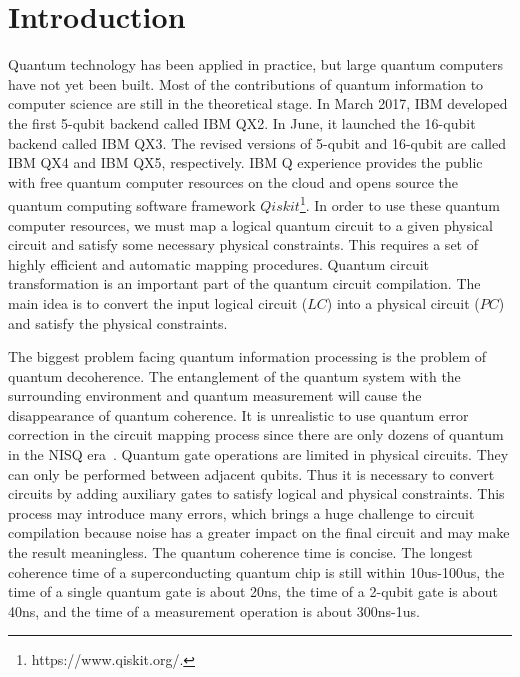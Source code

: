 \documentclass[runningheads]{llncs}
\begin{document}
\section{Introduction}
\label{Introduction}
Quantum technology has been applied in practice, but large quantum computers have not yet been built. Most of the contributions of quantum information to computer science are still in the theoretical stage. In March 2017, IBM developed the first 5-qubit backend called IBM QX2.  In June, it launched the 16-qubit backend called IBM QX3. The revised versions of 5-qubit and 16-qubit are called IBM QX4 and IBM QX5, respectively. IBM Q experience provides the public with free quantum computer resources on the cloud and opens source the quantum computing software framework $Qiskit$\footnote{https://www.qiskit.org/.}. In order to use these quantum computer resources, we must map a logical quantum circuit to a given physical circuit and satisfy some necessary physical constraints. This requires a set of highly efficient and automatic mapping procedures. Quantum circuit transformation is an important part of the quantum circuit compilation. The main idea is to convert the input logical circuit ($LC$) into a physical circuit ($PC$) and satisfy the physical constraints.

The biggest problem facing quantum information processing is the problem of quantum decoherence. The entanglement of the quantum system with the surrounding environment and quantum measurement will cause the disappearance of quantum coherence. It is unrealistic to use quantum error correction in the circuit mapping process since there are only dozens of quantum in the NISQ era~\cite{2018QuantumPreskill}. Quantum gate operations are limited in physical circuits. They can only be performed between adjacent qubits. Thus it is necessary to convert circuits by adding auxiliary gates to satisfy logical and physical constraints. This process may introduce many errors, which brings a huge challenge to circuit compilation because noise has a greater impact on the final circuit and may make the result meaningless. The quantum coherence time is concise. The longest coherence time of a superconducting quantum chip is still within 10us-100us, the time of a single quantum gate is about 20ns, the time of a 2-qubit gate is about 40ns, and the time of a measurement operation is about 300ns-1us. 
\end{document}

